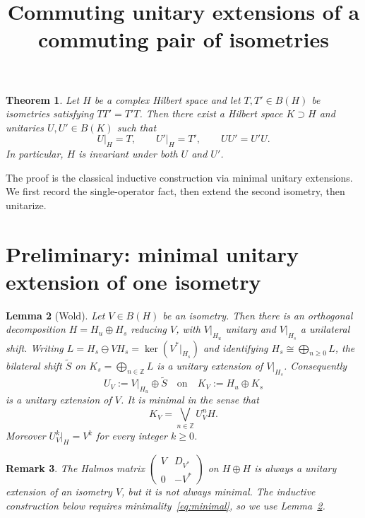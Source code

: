 \documentclass[11pt]{article}
\title{Commuting unitary extensions of a commuting pair of isometries}
\author{}
\date{}
\newtheorem{theorem}{Theorem}
\newtheorem{lemma}[theorem]{Lemma}
\newtheorem{remark}[theorem]{Remark}
\begin{document}
\maketitle

\begin{theorem}
\label{thm:main}
Let \(H\) be a complex Hilbert space and let \(T,T'\in B(H)\) be isometries
satisfying \(TT'=T'T\). Then there exist a Hilbert space \(K\supset H\) and
unitaries \(U,U'\in B(K)\) such that
\[
U\big|_H=T,\qquad
U'\big|_H=T',\qquad
UU'=U'U.
\]
In particular, \(H\) is invariant under both \(U\) and \(U'\).
\end{theorem}

\noindent
The proof is the classical inductive construction via minimal unitary extensions.
We first record the single-operator fact, then extend the second isometry, then
unitarize.

\bigskip
\section*{Preliminary: minimal unitary extension of one isometry}

\begin{lemma}[Wold]
\label{lem:wold}
Let \(V\in B(H)\) be an isometry. Then there is an orthogonal decomposition
\(H=H_u\oplus H_s\) reducing \(V\), with \(V\big|_{H_u}\) unitary and
\(V\big|_{H_s}\) a unilateral shift. Writing \(L=H_s\ominus VH_s=\ker(V^*\big|_{H_s})\)
and identifying \(H_s\cong\bigoplus_{n\ge 0}L\), the bilateral shift \(\widetilde{S}\) on
\(K_s=\bigoplus_{n\in\mathbb{Z}}L\) is a unitary extension of \(V\big|_{H_s}\).
Consequently
\[
U_V:=V\big|_{H_u}\oplus\widetilde{S}
\quad\text{on}\quad
K_V:=H_u\oplus K_s
\]
is a unitary extension of \(V\). It is \emph{minimal} in the sense that
\begin{equation}
\label{eq:minimal}
K_V=\bigvee_{n\in\mathbb{Z}}U_V^n H.
\end{equation}
Moreover \(U_V^k\big|_H=V^k\) for every integer \(k\ge 0\).
\end{lemma}

\begin{remark}
The Halmos matrix
\(\displaystyle\begin{pmatrix}V&D_{V^*}\\ 0&-V^*\end{pmatrix}\)
on \(H\oplus H\) is always a unitary extension of an isometry \(V\), but it is
\emph{not} always minimal. The inductive construction below requires
minimality~\eqref{eq:minimal}, so we use Lemma~\ref{lem:wold}.
\end{remark}
\end{document}
